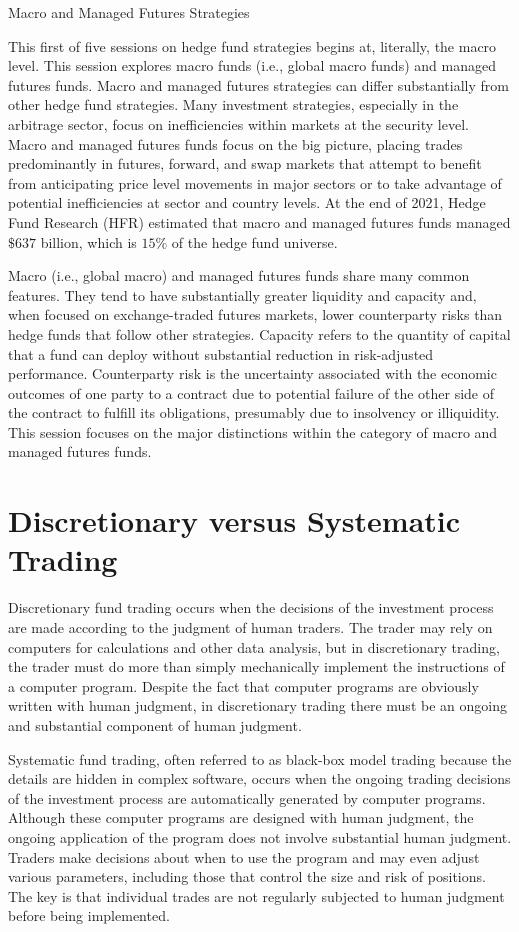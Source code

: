 \documentclass[11pt]{article}
\begin{document}
Macro and Managed Futures Strategies

This first of five sessions on hedge fund strategies begins at, literally, the macro level. This session explores macro funds (i.e., global macro funds) and managed futures funds. Macro and managed futures strategies can differ substantially from other hedge fund strategies. Many investment strategies, especially in the arbitrage sector, focus on inefficiencies within markets at the security level. Macro and managed futures funds focus on the big picture, placing trades predominantly in futures, forward, and swap markets that attempt to benefit from anticipating price level movements in major sectors or to take advantage of potential inefficiencies at sector and country levels. At the end of 2021, Hedge Fund Research (HFR) estimated that macro and managed futures funds managed $\$ 637$ billion, which is $15 \%$ of the hedge fund universe.

Macro (i.e., global macro) and managed futures funds share many common features. They tend to have substantially greater liquidity and capacity and, when focused on exchange-traded futures markets, lower counterparty risks than hedge funds that follow other strategies. Capacity refers to the quantity of capital that a fund can deploy without substantial reduction in risk-adjusted performance. Counterparty risk is the uncertainty associated with the economic outcomes of one party to a contract due to potential failure of the other side of the contract to fulfill its obligations, presumably due to insolvency or illiquidity. This session focuses on the major distinctions within the category of macro and managed futures funds.

\section*{Discretionary versus Systematic Trading}
Discretionary fund trading occurs when the decisions of the investment process are made according to the judgment of human traders. The trader may rely on computers for calculations and other data analysis, but in discretionary trading, the trader must do more than simply mechanically implement the instructions of a computer program. Despite the fact that computer programs are obviously written with human judgment, in discretionary trading there must be an ongoing and substantial component of human judgment.

Systematic fund trading, often referred to as black-box model trading because the details are hidden in complex software, occurs when the ongoing trading decisions of the investment process are automatically generated by computer programs. Although these computer programs are designed with human judgment, the ongoing application of the program does not involve substantial human judgment. Traders make decisions about when to use the program and may even adjust various parameters, including those that control the size and risk of positions. The key is that individual trades are not regularly subjected to human judgment before being implemented.
\end{document}
